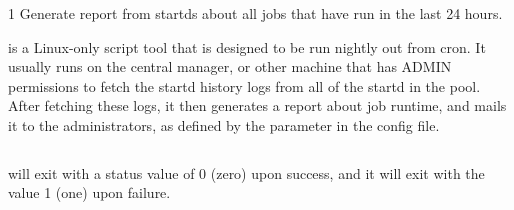 \begin{ManPage}{\label{man-pool-job-report}}{1}
{Generate report from startds about all jobs that have run in the last 24 hours.}
\Synopsis



\Description

 is a Linux-only script
tool that is designed to be run nightly out from cron.
It usually runs on the central manager, or other machine
that has ADMIN permissions to fetch the startd history logs
from all of the startd in the pool.  After fetching these
logs, it then generates a report about job runtime, and
mails it to the administrators, as defined by the
 parameter in the config file.

\begin{verbatim}
\end{verbatim}

\ExitStatus

 will exit with a status value of 0 (zero) upon success,
and it will exit with the value 1 (one) upon failure.

\end{ManPage}
